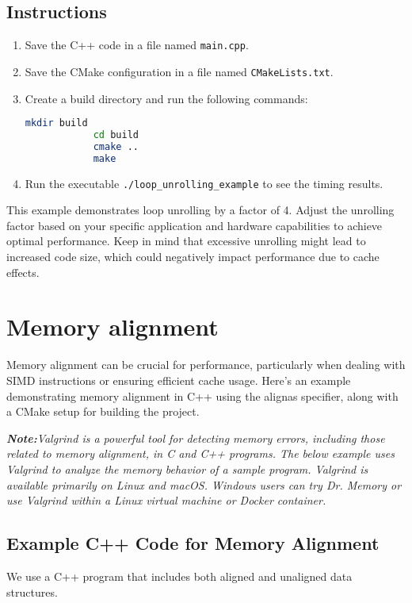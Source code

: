 \documentclass{article}
\begin{document}
	\subsection{Instructions}
	\begin{enumerate}
		\item Save the C++ code in a file named \texttt{main.cpp}.
		\item Save the CMake configuration in a file named \texttt{CMakeLists.txt}.
		\item Create a build directory and run the following commands:
		\begin{lstlisting}[language=bash]
			mkdir build
			cd build
			cmake ..
			make
		\end{lstlisting}
		\item Run the executable \texttt{./loop\_unrolling\_example} to see the timing results.
	\end{enumerate}
	
	This example demonstrates loop unrolling by a factor of 4. Adjust the unrolling factor based on your specific application and hardware capabilities to achieve optimal performance. Keep in mind that excessive unrolling might lead to increased code size, which could negatively impact performance due to cache effects.
	
	\section{Memory alignment}
	Memory alignment can be crucial for performance, particularly when dealing with SIMD instructions or ensuring efficient cache usage. Here's an example demonstrating memory alignment in C++ using the alignas specifier, along with a CMake setup for building the project.
	
	\textit{\textbf{Note:}Valgrind is a powerful tool for detecting memory errors, including those related to memory alignment, in C and C++ programs. The below example uses Valgrind to analyze the memory behavior of a sample program. Valgrind is available primarily on Linux and macOS. Windows users can try Dr. Memory or use Valgrind within a Linux virtual machine or Docker container.}
	
	\subsection{Example C++ Code for Memory Alignment}
	We use a C++ program that includes both aligned and unaligned data structures.
	
\end{document}
